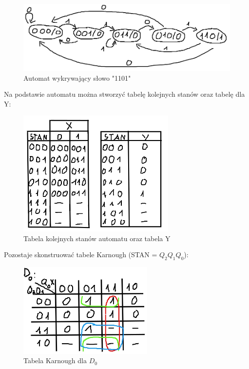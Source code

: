 \documentclass{article}
\begin{document}
\begin{figure}[H]
    \centering
    \includegraphics[width=\textwidth]{3c_automaton.jpg}
    \caption{Automat wykrywający słowo "1101"}
\end{figure}

Na podstawie automatu można stworzyć tabelę kolejnych stanów oraz tabelę dla Y:

\begin{figure}[H]
    \centering
    \includegraphics[width=0.7\textwidth]{3c_tabela.jpg}
    \caption{Tabela kolejnych stanów automatu oraz tabela Y}
\end{figure}

Pozostaje skonstruować tabele Karnough (STAN = $Q_2Q_1Q_0$):

\begin{figure}[H]
    \centering
    \includegraphics[width=0.6\textwidth]{3c_karn_0.jpg}
    \caption{Tabela Karnough dla $D_0$}
\end{figure}
\end{document}
